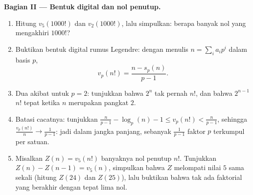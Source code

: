 \begin{problem}
\medskip
\noindent\textbf{Bagian II --- Bentuk digital dan nol
penutup.}
\begin{enumerate}[resume]
  \item Hitung $v_5(1000!)$ dan $v_2(1000!)$, lalu simpulkan: berapa
        banyak nol yang mengakhiri $1000!$?
  \item Buktikan bentuk digital rumus Legendre: dengan menulis $n =
        \sum_i a_i p^i$ dalam basis $p$,
        \[
        v_p(n!) = \frac{n - s_p(n)}{p - 1} .
        \]
  \item Dua akibat untuk $p = 2$: tunjukkan bahwa $2^n$ tak pernah
         $n!$, dan bahwa $2^{n-1}$  $n!$ tepat ketika
        $n$ merupakan pangkat $2$.
  \item Batasi cacatnya: tunjukkan $\frac n{p-1} - \log_p(n) - 1 \leq
        v_p(n!) < \frac n{p-1}$, sehingga $\frac{v_p(n!)}{n} \to
        \frac1{p-1}$: jadi dalam jangka panjang, sebanyak
        $\frac1{p-1}$ faktor $p$ terkumpul per satuan.
  \item Misalkan $Z(n) = v_5(n!)$ banyaknya nol penutup
        $n!$. Tunjukkan $Z(n) - Z(n-1) = v_5(n)$, simpulkan bahwa $Z$ melompati
        nilai $5$ sama sekali (hitung $Z(24)$ dan $Z(25)$), lalu
        buktikan bahwa tak ada faktorial yang berakhir dengan tepat lima nol.
\end{enumerate}


\end{problem}

